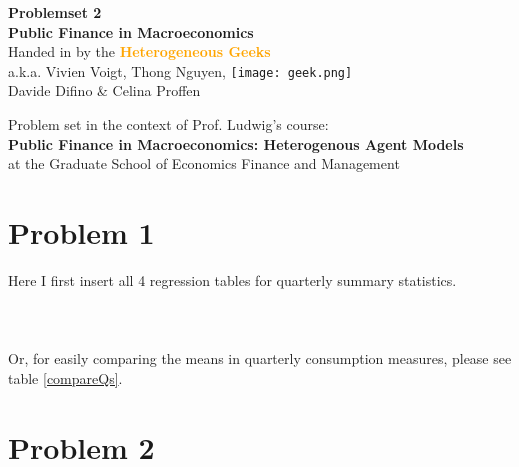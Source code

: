 \documentclass[12pt,a4paper]{article}
\begin{document}
\begin{center}
       \vspace*{1cm}
       \huge\textbf{Problemset 2} \\
       \vspace{0.4cm}
       \large \textbf{Public Finance in Macroeconomics} \\
       \vspace{0.5cm}
        \large Handed in by the \textcolor{orange}{\textbf{Heterogeneous Geeks}} \\ 
        \vspace{0.3cm}
        a.k.a. Vivien Voigt, Thong Nguyen, \texttt{[image: geek.png]}\\Davide Difino \& Celina Proffen \\
       \vspace{1.5cm}
       \vfill
       
       
        Problem set in the context of Prof. Ludwig's course: \\
        \textbf{Public Finance in Macroeconomics: Heterogenous Agent Models}\\
        at the Graduate School of Economics Finance and Management
       \vspace{0.8cm}
   \end{center}

\newpage
\section*{Problem 1}

Here I first insert all 4 regression tables for quarterly summary statistics.
\\
\\
\\
\\

Or, for easily comparing the means in quarterly consumption measures, please see table \ref{compareQs}.



\section*{Problem 2}
\end{document}
